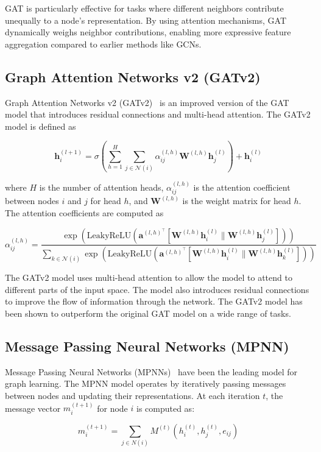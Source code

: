 GAT is particularly effective for tasks where different neighbors contribute unequally to a node's representation. By using attention mechanisms, GAT dynamically weighs neighbor contributions, enabling more expressive feature aggregation compared to earlier methods like GCNs.

\subsection{Graph Attention Networks v2 (GATv2)}
Graph Attention Networks v2 (GATv2)~\cite{brody2021attentive} is an improved version of the GAT model that introduces residual connections and multi-head attention. The GATv2 model is defined as

$$
    \mathbf{h}_i^{(l+1)} = \sigma \left( \sum_{h=1}^{H} \sum_{j \in \mathcal{N}(i)} \alpha_{ij}^{(l,h)} \mathbf{W}^{(l,h)} \mathbf{h}_j^{(l)} \right) + \mathbf{h}_i^{(l)}
$$

where $H$ is the number of attention heads, $\alpha_{ij}^{(l,h)}$ is the attention coefficient between nodes $i$ and $j$ for head $h$, and $\mathbf{W}^{(l,h)}$ is the weight matrix for head $h$. The attention coefficients are computed as

$$
    \alpha_{ij}^{(l,h)} = \frac{\exp \left( \textrm{LeakyReLU} \left( \mathbf{a}^{(l,h)^\top} [\mathbf{W}^{(l,h)} \mathbf{h}_i^{(l)} \| \mathbf{W}^{(l,h)} \mathbf{h}_j^{(l)}] \right) \right)}{\sum_{k \in \mathcal{N}(i)} \exp \left( \textrm{LeakyReLU} \left( \mathbf{a}^{(l,h)^\top} [\mathbf{W}^{(l,h)} \mathbf{h}_i^{(l)} \| \mathbf{W}^{(l,h)} \mathbf{h}_k^{(l)}] \right) \right)}
$$

The GATv2 model uses multi-head attention to allow the model to attend to different parts of the input space. The model also introduces residual connections to improve the flow of information through the network. The GATv2 model has been shown to outperform the original GAT model on a wide range of tasks.

\subsection{Message Passing Neural Networks (MPNN)}
Message Passing Neural Networks (MPNNs)~\cite{gilmer2017neural} have been the leading model for graph learning. The MPNN model operates by iteratively passing messages between nodes and updating their representations. At each iteration $t$, the message vector $m_i^{(t+1)}$ for node $i$ is computed as:

$$
    m_i^{(t+1)} = \sum_{j\in N(i)}M^{(t)}(h_i^{(t)}, h_j^{(t)}, e_{ij})
$$

